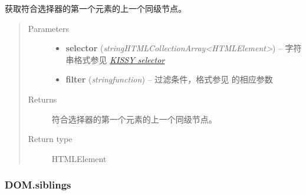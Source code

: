 \documentclass[letterpaper,10pt,english]{sphinxmanual}
\begin{document}
\begin{fulllineitems}
\label{api/core/dom/prev:DOM.prev}
获取符合选择器的第一个元素的上一个同级节点。
\begin{quote}\begin{description}
\item[{Parameters}] \leavevmode\begin{itemize}
\item {}
\textbf{selector} (\emph{string\textbar{}HTMLCollection\textbar{}Array\textless{}HTMLElement\textgreater{}}) -- 字符串格式参见 {\hyperref[api/core/dom/selector:dom-selector]{\emph{KISSY selector}}}

\item {}
\textbf{filter} (\emph{string\textbar{}function}) -- 过滤条件，格式参见 {\hyperref[api/core/dom/filter:DOM.filter]{}} 的相应参数

\end{itemize}

\item[{Returns}] \leavevmode
符合选择器的第一个元素的上一个同级节点。

\item[{Return type}] \leavevmode
HTMLElement

\end{description}\end{quote}

\end{fulllineitems}



\subsubsection{DOM.siblings}
\label{api/core/dom/siblings:dom-siblings}\label{api/core/dom/siblings::doc}
\end{document}
